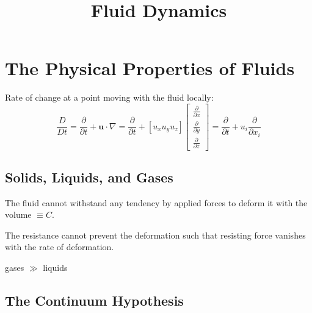 \documentclass{blog}
\title{Fluid Dynamics}
\begin{document}
\maketitle
\tableofcontents
\section{The Physical Properties of Fluids}
\begin{definition}
    Rate of change at a point moving with the fluid locally:
    \begin{equation}
        \frac{D}{Dt} = \frac{\partial}{\partial t} + \boldsymbol{u} \cdot \nabla
        = \frac{\partial}{\partial t} + [u_{x} u_{y} u_{z}]
        \begin{bmatrix}
            \frac{\partial}{\partial x} \\
            \frac{\partial}{\partial y} \\
            \frac{\partial}{\partial z}
        \end{bmatrix}
        = \frac{\partial }{\partial t} + u_{i}\frac{\partial}{\partial x_{i}}
    \end{equation}
\end{definition}

\subsection{Solids, Liquids, and Gases}
\begin{definition}
    The fluid cannot withstand any tendency by applied forces to deform it with the volume $\equiv C$.
\end{definition}

\begin{definition}[resistance]
    The resistance cannot prevent the deformation such that resisting force vanishes with the rate of deformation.
\end{definition}

\begin{definition}[compressibility]
    gases $\gg$ liquids
\end{definition}

\begin{definition}[pressure]

\end{definition}

\subsection{The Continuum Hypothesis}

\printbibliography
\end{document}
